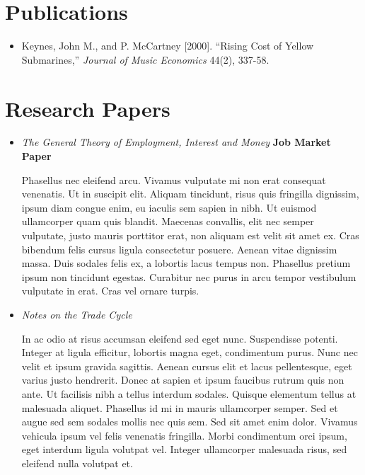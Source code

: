 \documentclass{article}[12]
\begin{document}
\section{Publications}

\begin{itemize}
    \item Keynes, John M., and P. McCartney [2000]. ``Rising Cost of Yellow Submarines,'' \emph{Journal of Music Economics} 44(2), 337-58.
\end{itemize}


\section{Research Papers}

\begin{itemize}[itemsep=1.5em]

\item \emph{The General Theory of Employment, Interest and Money} \hfill \textbf{Job Market Paper}

Phasellus nec eleifend arcu. Vivamus vulputate mi non erat consequat venenatis. Ut in suscipit elit. Aliquam tincidunt, risus quis fringilla dignissim, ipsum diam congue enim, eu iaculis sem sapien in nibh. Ut euismod ullamcorper quam quis blandit. Maecenas convallis, elit nec semper vulputate, justo mauris porttitor erat, non aliquam est velit sit amet ex. Cras bibendum felis cursus ligula consectetur posuere. Aenean vitae dignissim massa. Duis sodales felis ex, a lobortis lacus tempus non. Phasellus pretium ipsum non tincidunt egestas. Curabitur nec purus in arcu tempor vestibulum vulputate in erat. Cras vel ornare turpis. 

\item \emph{Notes on the Trade Cycle} 

In ac odio at risus accumsan eleifend sed eget nunc. Suspendisse potenti. Integer at ligula efficitur, lobortis magna eget, condimentum purus. Nunc nec velit et ipsum gravida sagittis. Aenean cursus elit et lacus pellentesque, eget varius justo hendrerit. Donec at sapien et ipsum faucibus rutrum quis non ante. Ut facilisis nibh a tellus interdum sodales. Quisque elementum tellus at malesuada aliquet. Phasellus id mi in mauris ullamcorper semper. Sed et augue sed sem sodales mollis nec quis sem. Sed sit amet enim dolor. Vivamus vehicula ipsum vel felis venenatis fringilla. Morbi condimentum orci ipsum, eget interdum ligula volutpat vel. Integer ullamcorper malesuada risus, sed eleifend nulla volutpat et. 

\end{itemize}
\end{document}
